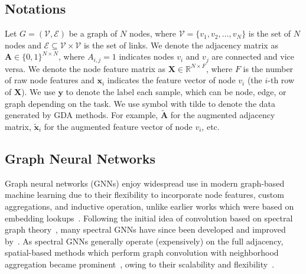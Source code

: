 \documentclass[11pt]{article}
\begin{document}
\subsection{Notations}
Let $G = (\mathcal{V}, \mathcal{E})$ be a graph of $N$ nodes, where $\mathcal{V} = \{v_1, v_2, \dots, v_N\}$ is the set of $N$ nodes and $\mathcal{E} \subseteq \mathcal{V} \times \mathcal{V}$ is the set of links. We denote the adjacency matrix as $\mathbf{A} \in \{0, 1\}^{N \times N}$, where $A_{i,j} = 1$ indicates nodes $v_i$ and $v_j$ are connected and vice versa. We denote the node feature matrix as $\mathbf{X} \in \mathbb{R}^{N \times F}$, where $F$ is the number of raw node features and $\boldsymbol{x}_{i}$ indicates the feature vector of node $v_i$ (the $i$-th row of $\mathbf{X}$). We use $\boldsymbol{y}$ to denote the label each sample, which can be node, edge, or graph depending on the task. We use symbol with tilde to denote the data generated by GDA methods. For example, $\tilde{\mathbf{A}}$ for the augmented adjacency matrix, $\tilde{\boldsymbol{x}}_i$ for the augmented feature vector of node $v_i$,  etc.


\subsection{Graph Neural Networks}

Graph neural networks (GNNs) enjoy widespread use in modern graph-based machine learning due to their flexibility to incorporate node features, custom aggregations, and inductive operation, unlike earlier works which were based on embedding lookups~\cite{perozzi2014deepwalk,grover2016node2vec}. Following the initial idea of convolution based on spectral graph theory~\cite{bruna2013spectral}, many spectral GNNs have since been developed and improved by~\cite{defferrard2016convolutional,kipf2016semi,levie2018cayleynets,klicpera2018predict,ma2021unified}. As spectral GNNs generally operate (expensively) on the full adjacency, spatial-based methods which perform graph convolution with neighborhood aggregation became prominent~\cite{hamilton2017inductive,velivckovic2017graph}, owing to their scalability and flexibility~\cite{ying2018graph,wu2020comprehensive}. 
\end{document}
